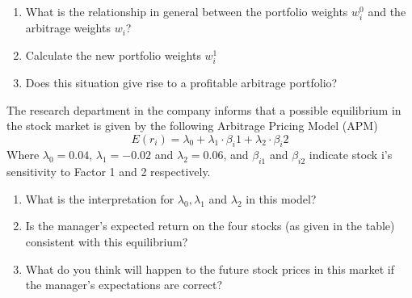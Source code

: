 \documentclass[12]{article}
\begin{document}
\begin{table}[H]
\centering
{}
\label{tab:my-table}
\end{table}
\begin{enumerate}
    \item[a)] What is the relationship in general between the portfolio weights $w_i^0$ and the arbitrage weights $w_i$?
    \item[b)] Calculate the new portfolio weights $w_i^1$
    \item[c)] Does this situation give rise to a profitable arbitrage portfolio?
\end{enumerate}

\noindent

\noindent

\noindent

\noindent
The research department in the company informs that a possible equilibrium in the stock market is given by the following Arbitrage Pricing Model (APM)
\begin{equation*}
    E(r_i) = \lambda_0 + \lambda_1\cdot \beta_i1 + \lambda_2\cdot \beta_i2
\end{equation*}
Where $\lambda_0 = 0.04$, $\lambda_1 = -0.02$ and $\lambda_2 = 0.06$, and $\beta_{i1}$ and $\beta_{i2}$ indicate stock i's sensitivity to Factor 1 and 2 respectively.
\begin{enumerate}
    \item[d)] What is the interpretation for $\lambda_0, \lambda_1$ and $\lambda_2$ in this model?
    \item[e)] Is the manager's expected return on the four stocks (as given in the table) consistent with this equilibrium?
    \item[f)] What do you think will happen to the future stock prices in this market if the manager's expectations are correct?
\end{enumerate}
\end{document}

